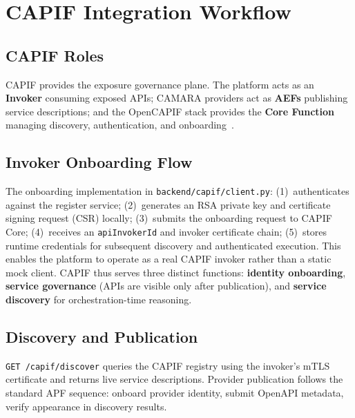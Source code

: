 \documentclass[conference]{IEEEtran}
\begin{document}
\section{CAPIF Integration Workflow}

\subsection{CAPIF Roles}

CAPIF provides the exposure governance plane. The platform acts as an
\textbf{Invoker} consuming exposed APIs; CAMARA providers act as
\textbf{AEFs} publishing service descriptions; and the OpenCAPIF stack
provides the \textbf{Core Function} managing discovery, authentication,
and onboarding~\cite{molina2022}.

\subsection{Invoker Onboarding Flow}

The onboarding implementation in \texttt{backend/capif/client.py}:
(1)~authenticates against the register service;
(2)~generates an RSA private key and certificate signing request (CSR)
locally;
(3)~submits the onboarding request to CAPIF Core;
(4)~receives an \texttt{apiInvokerId} and invoker certificate chain;
(5)~stores runtime credentials for subsequent discovery and authenticated
execution.
This enables the platform to operate as a real CAPIF invoker rather than
a static mock client. CAPIF thus serves three distinct functions:
\textbf{identity onboarding}, \textbf{service governance} (APIs are
visible only after publication), and \textbf{service discovery} for
orchestration-time reasoning.

\subsection{Discovery and Publication}

\texttt{GET /capif/discover} queries the CAPIF registry using the invoker's
mTLS certificate and returns live service descriptions. Provider publication
follows the standard APF sequence: onboard provider identity, submit OpenAPI
metadata, verify appearance in discovery results.

\end{document}
